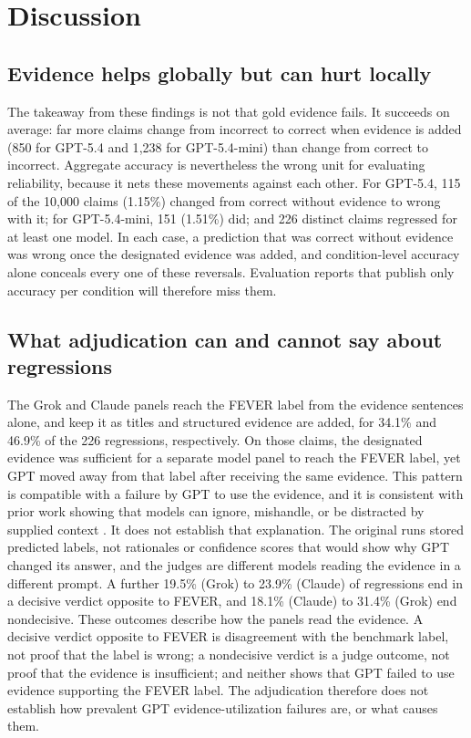 \section{Discussion}
\label{sec:discussion}

\subsection{Evidence helps globally but can hurt locally}
The takeaway from these findings is not that gold evidence fails.
It succeeds on average: far more claims change from incorrect to correct when evidence is added (850 for GPT-5.4 and 1{,}238 for GPT-5.4-mini) than change from correct to incorrect.
Aggregate accuracy is nevertheless the wrong unit for evaluating reliability, because it nets these movements against each other.
For GPT-5.4, 115 of the 10{,}000 claims (1.15\%) changed from correct without evidence to wrong with it; for GPT-5.4-mini, 151 (1.51\%) did; and 226 distinct claims regressed for at least one model.
In each case, a prediction that was correct without evidence was wrong once the designated evidence was added, and condition-level accuracy alone conceals every one of these reversals.
Evaluation reports that publish only accuracy per condition will therefore miss them.

\subsection{What adjudication can and cannot say about regressions}
The Grok and Claude panels reach the FEVER label from the evidence sentences alone, and keep it as titles and structured evidence are added, for 34.1\% and 46.9\% of the 226 regressions, respectively.
On those claims, the designated evidence was sufficient for a separate model panel to reach the FEVER label, yet GPT moved away from that label after receiving the same evidence.
This pattern is compatible with a failure by GPT to use the evidence, and it is consistent with prior work showing that models can ignore, mishandle, or be distracted by supplied context \citep{longpre-etal-2021-entity,shi2023distracted,wan-etal-2024-evidence}.
It does not establish that explanation.
The original runs stored predicted labels, not rationales or confidence scores that would show why GPT changed its answer, and the judges are different models reading the evidence in a different prompt.
A further 19.5\% (Grok) to 23.9\% (Claude) of regressions end in a decisive verdict opposite to FEVER, and 18.1\% (Claude) to 31.4\% (Grok) end nondecisive.
These outcomes describe how the panels read the evidence.
A decisive verdict opposite to FEVER is disagreement with the benchmark label, not proof that the label is wrong; a nondecisive verdict is a judge outcome, not proof that the evidence is insufficient; and neither shows that GPT failed to use evidence supporting the FEVER label.
The adjudication therefore does not establish how prevalent GPT evidence-utilization failures are, or what causes them.


